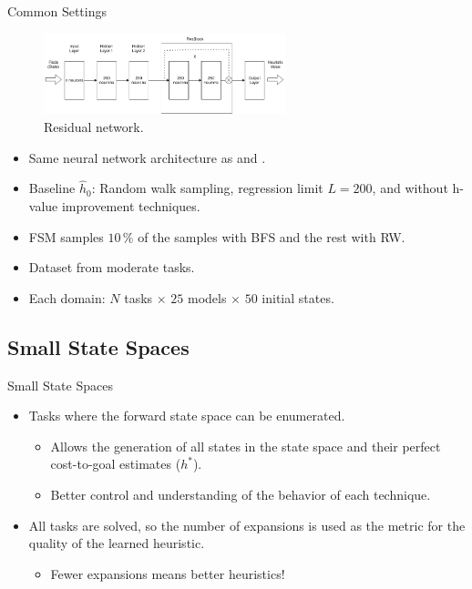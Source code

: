 \documentclass[10pt]{beamer}
\providecommand{\hvalue}[1]{\ensuremath{h^{#1}}\xspace}
\providecommand{\hstar}{\hvalue{*}}
\providecommand{\hnnbase}{\ensuremath{\hat h_{0}}\xspace}
\begin{document}
\begin{frame}{Common Settings}
\begin{figure}
    \centering
    \includegraphics[width=7cm]{figures/resnet.png}
    \caption{Residual network.}
\end{figure}
\begin{itemize}
    \item Same neural network architecture as \citet{ferber2022neural} and \citet{otoole2022sampling}.
    \item Baseline \hnnbase: Random walk sampling, regression limit $L = 200$, and without h-value improvement techniques.
    \item FSM samples $10\,\%$ of the samples with BFS and the rest with RW.
    \item Dataset from \citet{ferber2022neural} moderate tasks.
    \item Each domain: $N$ tasks $\times$ $25$ models $\times$ $50$ initial states.
\end{itemize}
\end{frame}

\subsection{Small State Spaces}

\begin{frame}{Small State Spaces}
\begin{itemize}
    \item Tasks where the forward state space can be enumerated.
    \begin{itemize}
        \item Allows the generation of all states in the state space and their perfect cost-to-goal estimates (\hstar).
        \item Better control and understanding of the behavior of each technique.
    \end{itemize}
    \bigskip
    \item All tasks are solved, so the number of expansions is used as the metric for the quality of the learned heuristic.
    \begin{itemize}
        \item \alert{Fewer expansions} means better heuristics!
    \end{itemize}
\end{itemize}
\end{frame}
\end{document}
